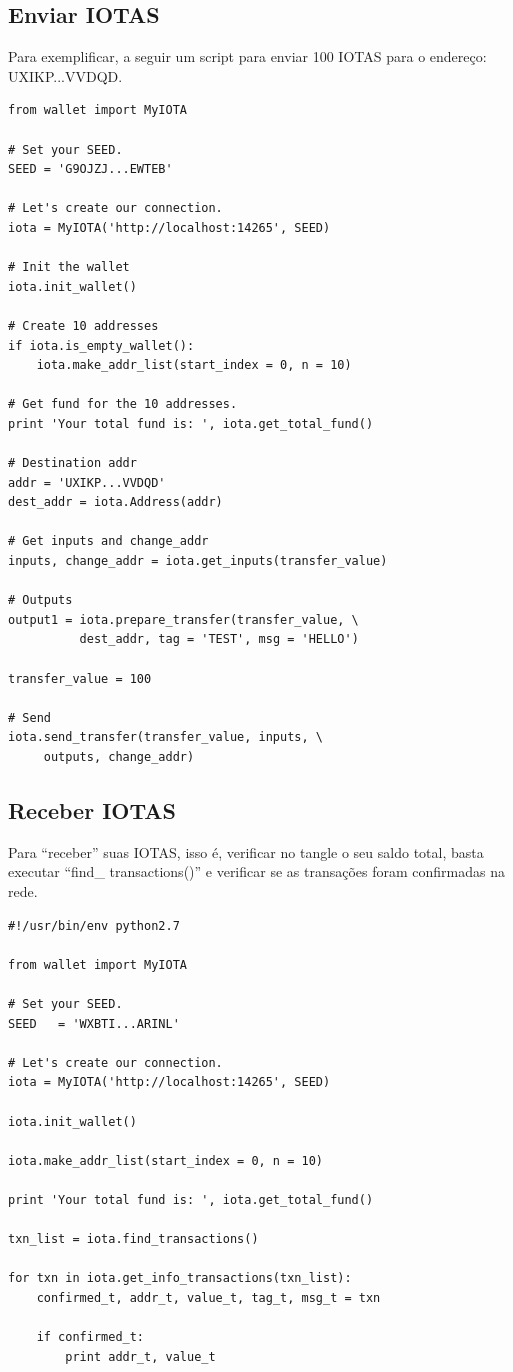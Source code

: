 \documentclass[a4paper]{article}
\begin{document}
\subsection{Enviar IOTAS}
Para exemplificar, a seguir um script para enviar 100 IOTAS para o endereço: UXIKP...VVDQD.

\begin{lstlisting}
from wallet import MyIOTA

# Set your SEED.
SEED = 'G9OJZJ...EWTEB'

# Let's create our connection.
iota = MyIOTA('http://localhost:14265', SEED)

# Init the wallet
iota.init_wallet()

# Create 10 addresses
if iota.is_empty_wallet():
    iota.make_addr_list(start_index = 0, n = 10)

# Get fund for the 10 addresses.
print 'Your total fund is: ', iota.get_total_fund()

# Destination addr
addr = 'UXIKP...VVDQD'
dest_addr = iota.Address(addr)

# Get inputs and change_addr
inputs, change_addr = iota.get_inputs(transfer_value)

# Outputs
output1 = iota.prepare_transfer(transfer_value, \
          dest_addr, tag = 'TEST', msg = 'HELLO')

transfer_value = 100

# Send
iota.send_transfer(transfer_value, inputs, \
     outputs, change_addr)
\end{lstlisting}

\subsection{Receber IOTAS}

Para ``receber'' suas IOTAS, isso é, verificar no tangle o seu saldo total, basta executar ``find\_ transactions()'' e
verificar se as transações foram confirmadas na rede.

\begin{lstlisting}
#!/usr/bin/env python2.7

from wallet import MyIOTA

# Set your SEED.
SEED   = 'WXBTI...ARINL'

# Let's create our connection.
iota = MyIOTA('http://localhost:14265', SEED)

iota.init_wallet()

iota.make_addr_list(start_index = 0, n = 10)

print 'Your total fund is: ', iota.get_total_fund()

txn_list = iota.find_transactions()

for txn in iota.get_info_transactions(txn_list):
    confirmed_t, addr_t, value_t, tag_t, msg_t = txn

    if confirmed_t:
        print addr_t, value_t
\end{lstlisting}
\end{document}
